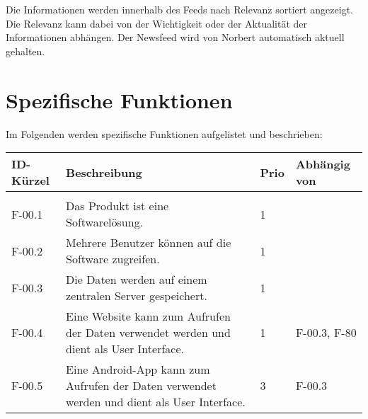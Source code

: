 Die Informationen werden innerhalb des Feeds nach Relevanz sortiert angezeigt. Die Relevanz kann dabei von der Wichtigkeit oder der Aktualität der Informationen abhängen. Der Newsfeed wird von Norbert automatisch aktuell gehalten.

\newpage
\section{Spezifische Funktionen}
Im Folgenden werden spezifische Funktionen aufgelistet und beschrieben:

\begin{tabularx}{\textwidth}{|l|X|l|l|}
    \toprule
    \textbf{ID-Kürzel} & \textbf{Beschreibung} & \textbf{Prio} & \textbf{Abhängig von} \\
    \hline
    \endhead
    \hline
    \caption{Funktionen}
    \endfoot
    \multicolumn{4}{|l|}{F-00 Allgemein}\\
    \hline
    F-00.1 & Das Produkt ist eine Softwarelösung. & 1 & \\
    F-00.2 & Mehrere Benutzer können auf die Software zugreifen. & 1 & \\
    F-00.3 & Die Daten werden auf einem zentralen Server gespeichert. & 1 & \\
    F-00.4 & Eine Website kann     zum Aufrufen der Daten verwendet werden und dient als User Interface. & 1 & F-00.3, F-80\\
    F-00.5 & Eine Android-App kann zum Aufrufen der Daten verwendet werden und dient als User Interface. & 3 & F-00.3 \\
    \hline



\end{tabularx}
